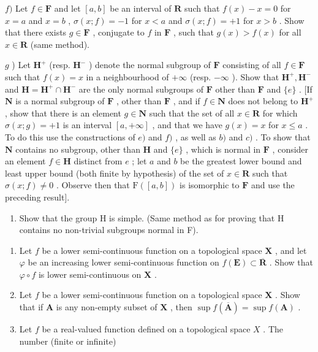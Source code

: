 \(f)\) Let \(f \in \mathbf{F}\) and let \([a, b]\) be an interval of \(\mathbf{R}\) such that \(f(x) - x = 0\) for \(x = a\) and \(x = b\) , \(\sigma(x; f) = -1\) for \(x < a\) and \(\sigma(x; f) = +1\) for \(x > b\) . Show that there exists \(g \in \mathbf{F}\) , conjugate to \(f\) in \(\mathbf{F}\) , such that \(g(x) > f(x)\) for all \(x \in \mathbf{R}\) (same method).

\(g\) ) Let \(\mathbf{H}^{+}\) (resp. \(\mathbf{H}^{-}\) ) denote the normal subgroup of \(\mathbf{F}\) consisting of all \(f\in \mathbf{F}\) such that \(f(x) = x\) in a neighbourhood of \(+\infty\) (resp. \(-\infty\) ). Show that \(\mathbf{H}^{+},\mathbf{H}^{-}\) and \(\mathbf{H} = \mathbf{H}^{+}\cap \mathbf{H}^{-}\) are the only normal subgroups of \(\mathbf{F}\) other than \(\mathbf{F}\) and \(\{e\}\) . {[}If \(\mathbf{N}\) is a normal subgroup of \(\mathbf{F}\) , other than \(\mathbf{F}\) , and if \(f\in \mathbf{N}\) does not belong to \(\mathbf{H}^{+}\) , show that there is an element \(g\in \mathbf{N}\) such that the set of all \(x\in \mathbf{R}\) for which \(\sigma (x;g) = +1\) is an interval \([a, + \infty ]\) , and that we have \(g(x) = x\) for \(x\leqslant a\) . To do this use the constructions of \(e)\) and \(f)\) , as well as \(b)\) and \(c)\) . To show that \(\mathbf{N}\) contains no subgroup, other than \(\mathbf{H}\) and \(\{e\}\) , which is normal in \(\mathbf{F}\) , consider an element \(f\in \mathbf{H}\) distinct from \(e\) ; let \(a\) and \(b\) be the greatest lower bound and least upper bound (both finite by hypothesis) of the set of \(x\in \mathbf{R}\) such that \(\sigma (x;f)\neq 0\) . Observe then that \(\mathrm{F}([a,b])\) is isomorphic to \(\mathbf{F}\) and use the preceding result{]}.

\begin{enumerate}
\def\labelenumi{\alph{enumi})}
\setcounter{enumi}{7}
\tightlist
\item
  Show that the group H is simple. (Same method as for proving that H contains no non-trivial subgroups normal in F).
\end{enumerate}

\begin{enumerate}
\def\labelenumi{\arabic{enumi})}
\setcounter{enumi}{3}
\item
  Let \(f\) be a lower semi-continuous function on a topological space \(\mathbf{X}\) , and let \(\varphi\) be an increasing lower semi-continuous function on \(f(\mathbf{E}) \subset \overline{\mathbf{R}}\) . Show that \(\varphi \circ f\) is lower semi-continuous on \(\mathbf{X}\) .
\item
  Let \(f\) be a lower semi-continuous function on a topological space \(\mathbf{X}\) . Show that if \(\mathbf{A}\) is any non-empty subset of \(\mathbf{X}\) , then \(\sup f(\overline{\mathbf{A}}) = \sup f(\mathbf{A})\) .
\item
  Let \(f\) be a real-valued function defined on a topological space \(X\) . The number (finite or infinite)
\end{enumerate}

